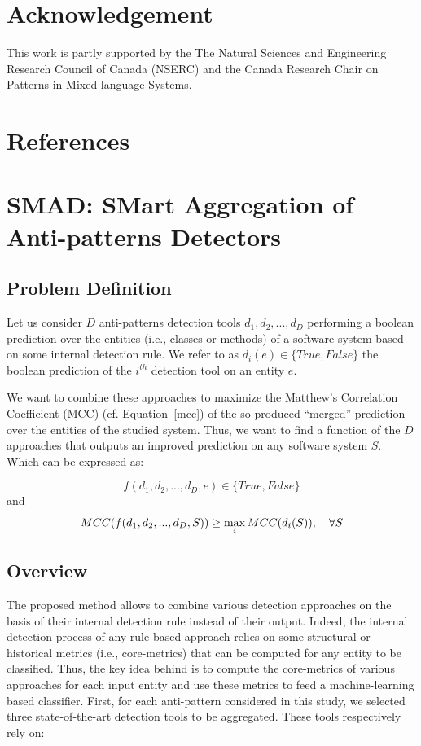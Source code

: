 \section*{Acknowledgement}
This work is partly supported by the The Natural Sciences and Engineering Research Council of Canada (NSERC) and the Canada Research Chair on Patterns in Mixed-language Systems.
\section{References}
\balance




\section{SMAD: SMart Aggregation of Anti-patterns Detectors}
\label{section: smad}
\subsection{Problem Definition}
Let us consider $D$ anti-patterns detection tools $d_{1},d_{2}, ..., d_{D}$ performing a boolean prediction over the entities (i.e., classes or methods) of a software system based on some internal detection rule. We refer to as $d_{i}(e) \in \{True, False\}$ the boolean prediction of the $i^{th}$ detection tool on an entity $e$.

We want to combine these approaches to maximize the Matthew's Correlation Coefficient (MCC) (cf. Equation~\ref{mcc}) of the so-produced ``merged'' prediction over the entities of the studied system. Thus, we want to find a function of the $D$ approaches that outputs an improved prediction on any software system $S$. Which can be expressed as:

\[f(d_{1},d_{2}, ..., d_{D}, e) \in \{True, False\}\] 
and 
\[MCC(f(d_{1},d_{2}, ..., d_{D}, S)) \geq \operatorname*{max}_{i} MCC(d_{i}(S)), \quad \forall S\]

\subsection{Overview}
\label{subsection: overview}
The proposed method \NAME{} allows to combine various detection approaches on the basis of their internal detection rule instead of their output. Indeed, the internal detection process of any rule based approach relies on some structural or historical metrics (i.e., core-metrics) that can be computed for any entity to be classified. Thus, the key idea behind \NAME{} is to compute the core-metrics of various approaches for each input entity and use these metrics to feed a machine-learning based classifier. First, for each anti-pattern considered in this study, we selected three state-of-the-art detection tools to be aggregated. These tools respectively rely on:

